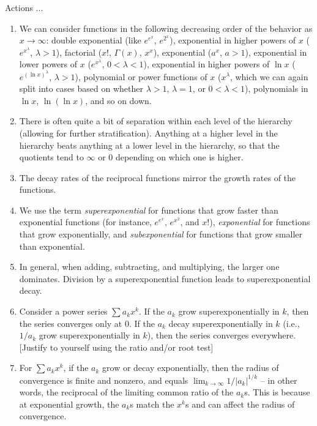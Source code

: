 \documentclass[10pt]{amsart}
\begin{document}
Actions ...

\begin{enumerate}
\item We can consider functions in the following decreasing order of
  the behavior as $x \to \infty$: double exponential (like $e^{e^x}$,
  $e^{2^x}$), exponential in higher powers of $x$ ($e^{x^\lambda}$,
  $\lambda > 1$), factorial ($x!$, $\Gamma(x)$, $x^x$), exponential
  ($a^x$, $a > 1$), exponential in lower powers of $x$
  ($e^{x^\lambda}$, $0 < \lambda < 1$), exponential in higher powers
  of $\ln x$ ($e^{(\ln x)^\lambda}$, $\lambda > 1$), polynomial or
  power functions of $x$ ($x^\lambda$, which we can again split into
  cases based on whether $\lambda > 1$, $\lambda = 1$, or $0 < \lambda
  < 1$), polynomials in $\ln x$, $\ln(\ln x)$, and so on down.
\item There is often quite a bit of separation within each level of
  the hierarchy (allowing for further stratification). Anything at a
  higher level in the hierarchy beats anything at a lower level in the
  hierarchy, so that the quotients tend to $\infty$ or $0$ depending
  on which one is higher.
\item The decay rates of the reciprocal functions mirror the growth
  rates of the functions.
\item We use the term {\em superexponential} for functions that grow
  faster than exponential functions (for instance, $e^{e^x}$,
  $e^{x^2}$, and $x!$), {\em exponential} for functions that grow
  exponentially, and {\em subexponential} for functions that grow
  smaller than exponential.
\item In general, when adding, subtracting, and multiplying, the
  larger one dominates. Division by a superexponential function leads
  to superexponential decay.
\item Consider a power series $\sum a_kx^k$. If the $a_k$ grow
  superexponentially in $k$, then the series converges only at $0$. If
  the $a_k$ decay superexponentially in $k$ (i.e., $1/a_k$ grow
  superexponentially in $k$), then the series converges
  everywhere. [Justify to yourself using the ratio and/or root test]
\item For $\sum a_kx^k$, if the $a_k$ grow or decay exponentially,
  then the radius of convergence is finite and nonzero, and equals
  $\lim_{k \to \infty} 1/|a_k|^{1/k}$ -- in other words, the
  reciprocal of the limiting common ratio of the $a_k$s. This is
  because at exponential growth, the $a_k$s match the $x^k$s and can
  affect the radius of convergence.

\end{enumerate}
\end{document}
